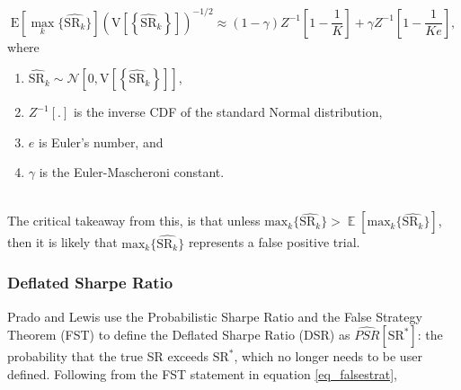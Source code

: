 \documentclass[a4paper,11pt,oneside]{article}
\DeclareMathOperator*{\E}{\mathbb{E}}
\theoremstyle{plain}
\theoremstyle{definition}
\begin{document}
	\begin{equation}\label{eq_falsestrat}
		\mathrm{E}\left[{\max_k}\{\widehat{\mathrm{SR}_k}\}\right]\left(\mathrm{V}\left[\left\{\widehat{\mathrm{SR}}_{k}\right\}\right]\right)^{-1 / 2}\approx(1-\gamma) Z^{-1}\left[1-\frac{1}{K}\right]+\gamma Z^{-1}\left[1-\frac{1}{K e}\right], 
	\end{equation}
		where
	\begin{enumerate}
		\item $\widehat{\mathrm{SR}}_{k} \sim \mathcal{N}\left[0, \mathrm{V}\left[\left\{\widehat{\mathrm{SR}}_{k}\right\}\right]\right]$, 
		\item $Z^{-1}[.]$ is the inverse CDF of the standard Normal distribution, 
		\item $e$ is Euler's number, and 
		\item $\gamma$ is the Euler-Mascheroni constant.
	\end{enumerate}
	~\\
	The critical takeaway from this, is that unless $\mathrm{max}_k\{\widehat{\mathrm{SR}_k}\} > \E\left[\mathrm{max}_k\{\widehat{\mathrm{SR}_k}\}\right]$, then it is likely that $\mathrm{max}_k\{\widehat{\mathrm{SR}_k}\}$ represents a false positive trial.
		
		
	
	\subsubsection{Deflated Sharpe Ratio}\label{imp_dsr_detail}
	
	Prado and Lewis use the Probabilistic Sharpe Ratio and the False Strategy Theorem (FST) to define the Deflated Sharpe Ratio (DSR) as $\widehat{PSR}[\mathrm{SR}^*]$: the probability that the true SR exceeds $\mathrm{SR}^*$, which no longer needs to be user defined. Following from the FST statement in equation \eqref{eq_falsestrat}, 
	
\end{document}
